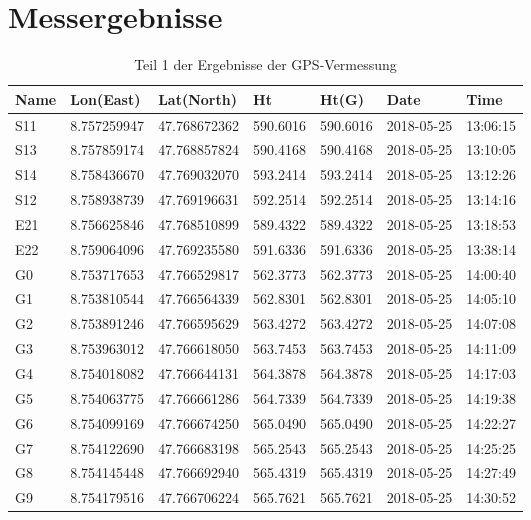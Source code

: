 \FloatBarrier
\section{Messergebnisse}

\begin{table}[!ht]
\centering
\caption{Teil 1 der Ergebnisse der GPS-Vermessung}
\label{tab:gps1}
\begin{tabular}{lllllll}
\toprule
Name    & Lon(East)   & Lat(North)   & Ht       & Ht(G)    & Date       & Time     \\
\midrule
S11     & 8.757259947 & 47.768672362 & 590.6016 & 590.6016 & 2018-05-25 & 13:06:15 \\
S13     & 8.757859174 & 47.768857824 & 590.4168 & 590.4168 & 2018-05-25 & 13:10:05 \\
S14     & 8.758436670 & 47.769032070 & 593.2414 & 593.2414 & 2018-05-25 & 13:12:26 \\
S12     & 8.758938739 & 47.769196631 & 592.2514 & 592.2514 & 2018-05-25 & 13:14:16 \\
E21     & 8.756625846 & 47.768510899 & 589.4322 & 589.4322 & 2018-05-25 & 13:18:53 \\
E22     & 8.759064096 & 47.769235580 & 591.6336 & 591.6336 & 2018-05-25 & 13:38:14 \\
G0      & 8.753717653 & 47.766529817 & 562.3773 & 562.3773 & 2018-05-25 & 14:00:40 \\
G1      & 8.753810544 & 47.766564339 & 562.8301 & 562.8301 & 2018-05-25 & 14:05:10 \\
G2      & 8.753891246 & 47.766595629 & 563.4272 & 563.4272 & 2018-05-25 & 14:07:08 \\
G3      & 8.753963012 & 47.766618050 & 563.7453 & 563.7453 & 2018-05-25 & 14:11:09 \\
G4      & 8.754018082 & 47.766644131 & 564.3878 & 564.3878 & 2018-05-25 & 14:17:03 \\
G5      & 8.754063775 & 47.766661286 & 564.7339 & 564.7339 & 2018-05-25 & 14:19:38 \\
G6      & 8.754099169 & 47.766674250 & 565.0490 & 565.0490 & 2018-05-25 & 14:22:27 \\
G7      & 8.754122690 & 47.766683198 & 565.2543 & 565.2543 & 2018-05-25 & 14:25:25 \\
G8      & 8.754145448 & 47.766692940 & 565.4319 & 565.4319 & 2018-05-25 & 14:27:49 \\
G9      & 8.754179516 & 47.766706224 & 565.7621 & 565.7621 & 2018-05-25 & 14:30:52 \\

\end{tabular}
\end{table}
